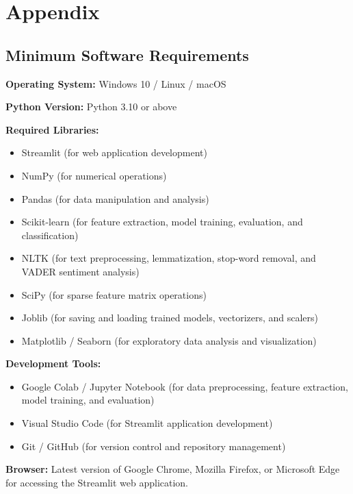 \documentclass[12pt,a4paper]{report}
\begin{document}
\newpage

\chapter{Appendix}

\section{Minimum Software Requirements}

\noindent
\textbf{Operating System:} Windows 10 / Linux / macOS

\noindent
\textbf{Python Version:} Python 3.10 or above

\vspace{0.3cm}

\noindent
\textbf{Required Libraries:}

\begin{itemize}
    \item Streamlit (for web application development)
    \item NumPy (for numerical operations)
    \item Pandas (for data manipulation and analysis)
    \item Scikit-learn (for feature extraction, model training,
    evaluation, and classification)
    \item NLTK (for text preprocessing, lemmatization,
    stop-word removal, and VADER sentiment analysis)
    \item SciPy (for sparse feature matrix operations)
    \item Joblib (for saving and loading trained models,
    vectorizers, and scalers)
    \item Matplotlib / Seaborn (for exploratory data analysis
    and visualization)
\end{itemize}

\noindent
\textbf{Development Tools:}

\begin{itemize}
    \item Google Colab / Jupyter Notebook (for data preprocessing,
    feature extraction, model training, and evaluation)
    \item Visual Studio Code (for Streamlit application development)
    \item Git / GitHub (for version control and repository management)
\end{itemize}

\noindent
\textbf{Browser:} Latest version of Google Chrome, Mozilla Firefox,
or Microsoft Edge for accessing the Streamlit web application.
\end{document}
